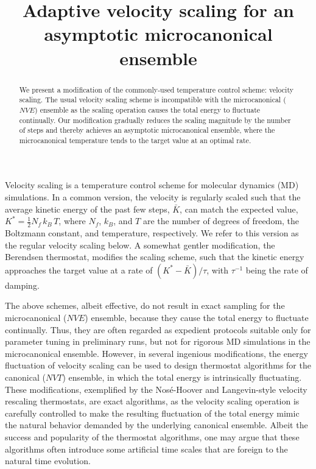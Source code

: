 \documentclass[reprint]{revtex4-1}
\begin{document}
\title{Adaptive velocity scaling for an asymptotic
microcanonical ensemble}
\author{}
\begin{abstract}
  We present a modification of the commonly-used
  temperature control scheme: velocity scaling.
  The usual velocity scaling scheme is incompatible with
  the microcanonical ($NVE$) ensemble
  as the scaling operation causes the total energy to fluctuate continually.
  Our modification gradually reduces the scaling magnitude
  by the number of steps
  and thereby achieves an asymptotic microcanonical ensemble,
  where the microcanonical temperature tends to the target value
  at an optimal rate.
\end{abstract}

\maketitle



Velocity scaling is a temperature control scheme
for molecular dynamics (MD) simulations.
%
In a common version,
the velocity is regularly scaled such that the average
kinetic energy of the past few steps, $\bar K$,
can match the expected value,
$K^* = \frac{1}{2} N_f \, k_B \, T$\cite{frenkel},
where $N_f$, $k_B$, and $T$ are the number of degrees of freedom,
the Boltzmann constant, and temperature, respectively.
%
We refer to this version as the regular velocity scaling below.
%
A somewhat gentler modification, the Berendsen thermostat\cite{berendsen1984},
modifies the scaling scheme, such that
the kinetic energy approaches the target value at a rate of
$\left( K^* - \bar K \right)/\tau$,
with $\tau^{-1}$ being the rate of damping.

The above schemes, albeit effective,
do not result in exact sampling for the microcanonical ($NVE$) ensemble\cite{hermansson1988},
because they cause the total energy to fluctuate continually.
%
Thus, they are often regarded as expedient protocols
suitable only for parameter tuning in preliminary runs,
but not for rigorous MD simulations in the microcanonical ensemble.
%
However, in several ingenious modifications,
the energy fluctuation of velocity scaling
can be used to design thermostat algorithms
for the canonical ($NVT$) ensemble, in which the total energy
is intrinsically fluctuating.
%
These modifications,
exemplified by the Nos\'e-Hoover\cite{nose1984, nose1984mp, hoover1985, martyna1992}
and Langevin-style velocity rescaling\cite{bussi2007} thermostats,
are exact algorithms, as
the velocity scaling operation is carefully
controlled to make
the resulting fluctuation of the total energy
mimic the natural behavior demanded by the underlying canonical ensemble.
%
Albeit the success and popularity of the thermostat algorithms,
one may argue that these algorithms often introduce
some artificial time scales that are foreign to the natural time evolution.
\end{document}
